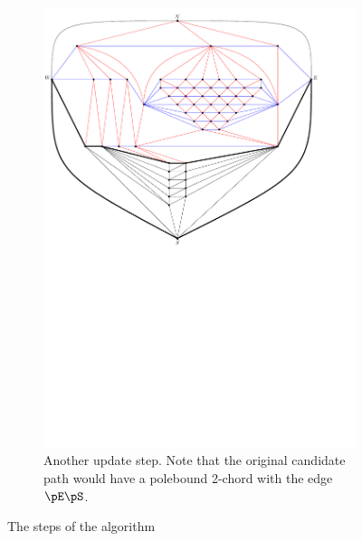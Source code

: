 \begin{figure}
\begin{subfigure}[b]{.9 \textwidth}
      \includegraphics[width=\textwidth]{examples/img/vertWorstCase/sweep6}
      \caption{Another update step. Note that the original candidate path would have a polebound 2-chord with the edge $\pE \pS$.}
      \label{fig:ex:vert:sweep6}
    \end{subfigure}
    \caption{The steps of the algorithm}
\end{figure}

